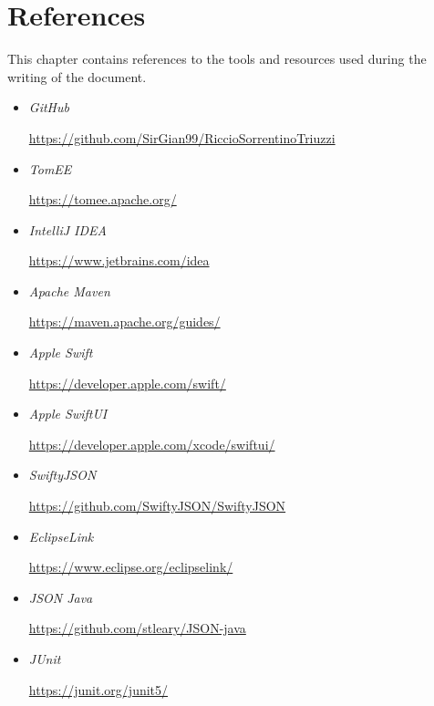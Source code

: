 \documentclass[a4paper,oneside,11pt]{book}
\begin{document}
\chapter{References}
    This chapter contains references to the tools and resources used during the writing of the document. \par
    \begin{itemize}
        \item \textit{GitHub} 
        
        \url{https://github.com/SirGian99/RiccioSorrentinoTriuzzi}
        \item \textit{TomEE} 
        
        \url{https://tomee.apache.org/}
        \item \textit{IntelliJ IDEA} 
        
        \url{https://www.jetbrains.com/idea}
        \item \textit{Apache Maven} 
        
        \url{https://maven.apache.org/guides/}
        \item \textit{Apple Swift} 
        
        \url{https://developer.apple.com/swift/}
        \item \textit{Apple SwiftUI} 
        
        \url{https://developer.apple.com/xcode/swiftui/}
        \item {\textit{SwiftyJSON}} 
        
        \url{https://github.com/SwiftyJSON/SwiftyJSON}
        \item \textit{EclipseLink} 
        
        \url{https://www.eclipse.org/eclipselink/}
        \item \textit{JSON Java} 
        
        \url{https://github.com/stleary/JSON-java}
        \item \textit{JUnit} 
        
        \url{https://junit.org/junit5/}

    \end{itemize}

\listoftables
\listoffigures
\end{document}
